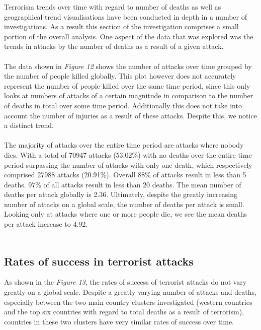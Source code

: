 \documentclass[10pt,a4paper]{article}
\begin{document}
Terrorism trends over time with regard to number of deaths as well as geographical trend visualisations have been conducted in depth in a number of investigations. 
As a result this section of the investigation comprises a small portion of the overall analysis. 
One aspect of the data that was explored was the trends in attacks by the number of deaths as a result of a given attack.
\\\\
The data shown in \textit{Figure 12} shows the number of attacks over time grouped by the number of people killed globally. 
This plot however does not accurately represent the number of people killed over the same time period, since this only looks at numbers of attacks of a certain magnitude in comparison to the number of deaths in total over some time period.
Additionally this does not take into account the number of injuries as a result of these attacks. 
Despite this, we notice a distinct trend. 
\\\\
The majority of attacks over the entire time period are attacks where nobody dies. 
With a total of 70947 attacks (53.02\%) with no deaths over the entire time period surpassing the number of attacks with only one death, which respectively comprised 27988 attacks (20.91\%).
Overall 88\% of attacks result in less than 5 deaths. 
97\% of all attacks result in less than 20 deaths.
The mean number of deaths per attack globally is 2.36. 
Ultimately, despite the greatly increasing number of attacks on a global scale, the number of deaths per attack is small. 
Looking only at attacks where one or more people die, we see the mean deaths per attack  increase to 4.92.
\\\\

\subsection{Rates of success in terrorist attacks}
As shown in the \textit{Figure 13}, the rates of success of terrorist attacks do not vary greatly on a global scale. Despite a greatly varying number of attacks and deaths, especially between the two main country clusters investigated (western countries and the top six countries with regard to total deaths as a result of terrorism), countries in these two clusters have very similar rates of success over time. 
\end{document}
